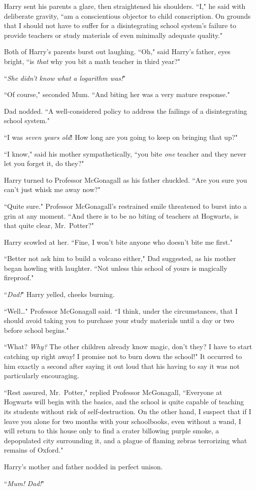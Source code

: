 Harry sent his parents a glare, then straightened his shoulders. ``I," he said with deliberate gravity, ``am a conscientious objector to child conscription. On grounds that I should not have to suffer for a disintegrating school system's failure to provide teachers or study materials of even minimally adequate quality."

Both of Harry's parents burst out laughing. ``Oh," said Harry's father, eyes bright, ``is \emph{that} why you bit a math teacher in third year?"

``\emph{She didn't know what a logarithm was!}"

``Of course," seconded Mum. ``And biting her was a very mature response."

Dad nodded. ``A well-considered policy to address the failings of a disintegrating school system."

``I was \emph{seven years old}! How long are you going to keep on bringing that up?"

``I know," said his mother sympathetically, ``you bite \emph{one} teacher and they never let you forget it, do they?"

Harry turned to Professor McGonagall as his father chuckled. ``Are you sure you can't just whisk me away now?"

``Quite sure." Professor McGonagall's restrained smile threatened to burst into a grin at any moment. ``And there is to be no biting of teachers at Hogwarts, is that quite clear, Mr.~Potter?"

Harry scowled at her. ``Fine, I won't bite anyone who doesn't bite me first."

``Better not ask him to build a volcano either," Dad suggested, as his mother began howling with laughter. ``Not unless this school of yours is magically fireproof."

``\emph{Dad!}" Harry yelled, cheeks burning.

``Well{\ldots}" Professor McGonagall said. ``I think, under the circumstances, that I should avoid taking you to purchase your study materials until a day or two before school begins."

``What? \emph{Why?} The other children already know magic, don't they? I have to start catching up right away! I promise not to burn down the school!" It occurred to him exactly a second after saying it out loud that his having to say it was not particularly encouraging.

``Rest assured, Mr.~Potter," replied Professor McGonagall, ``Everyone at Hogwarts will begin with the basics, and the school is quite capable of teaching its students without risk of self-destruction. On the other hand, I suspect that if I leave you alone for two months with your schoolbooks, even without a wand, I will return to this house only to find a crater billowing purple smoke, a depopulated city surrounding it, and a plague of flaming zebras terrorizing what remains of Oxford."

Harry's mother and father nodded in perfect unison.

``\emph{Mum! Dad!}"

